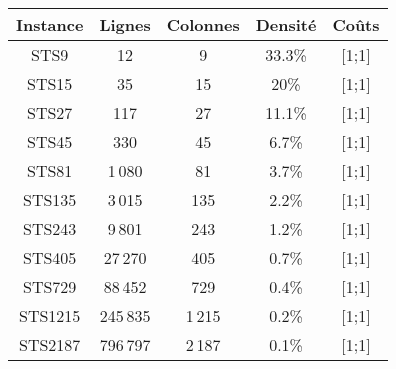 \begin{tabular}{ccccc}
	\toprule
	Instance & Lignes & Colonnes & Densité & Coûts\\
	\midrule
	STS9 & 12 & 9 & 33.3\% & [1;1]\\
	STS15 & 35 & 15 & 20\% & [1;1]\\
	STS27 & 117 & 27 & 11.1\% & [1;1]\\
	STS45 & 330 & 45 & 6.7\% & [1;1]\\
	STS81 & 1\,080 & 81 & 3.7\% & [1;1]\\
	STS135 & 3\,015 & 135 & 2.2\% & [1;1]\\
	STS243 & 9\,801 & 243 & 1.2\% & [1;1]\\
	STS405 & 27\,270 & 405 & 0.7\% & [1;1]\\
	STS729 & 88\,452 & 729 & 0.4\% & [1;1]\\
	STS1215 & 245\,835 & 1\,215 & 0.2\% & [1;1]\\
	STS2187 & 796\,797 & 2\,187 & 0.1\% & [1;1]\\
	\bottomrule
\end{tabular}
